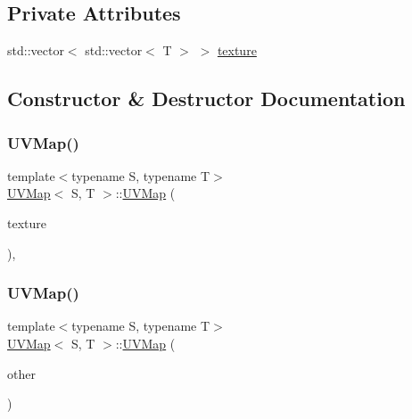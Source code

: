 \subsection*{Private Attributes}
\begin{DoxyCompactItemize}
\item 
std\+::vector$<$ std\+::vector$<$ T $>$ $>$ \mbox{\hyperlink{classUVMap_a6804b05501ac1221dd2e20eb43c83637}{texture}}
\end{DoxyCompactItemize}


\subsection{Constructor \& Destructor Documentation}
\mbox{\label{classUVMap_adc63ebfe75c0e4e3a1dfe47a4c0679f4}} 
\subsubsection{\texorpdfstring{UVMap()}{UVMap()}\hspace{0.1cm}{\footnotesize\ttfamily [1/2]}}
{\footnotesize\ttfamily template$<$typename S, typename T$>$ \\
\mbox{\hyperlink{classUVMap}{U\+V\+Map}}$<$ S, T $>$\+::\mbox{\hyperlink{classUVMap}{U\+V\+Map}} (\begin{DoxyParamCaption}\item[{const std\+::vector$<$ std\+::vector$<$ T $>$$>$ \&}]{texture }\end{DoxyParamCaption})\hspace{0.3cm}{\ttfamily [inline]}, {\ttfamily [explicit]}}

\mbox{\label{classUVMap_a0787e9239f59e850e4c3825d1985d8f3}} 
\subsubsection{\texorpdfstring{UVMap()}{UVMap()}\hspace{0.1cm}{\footnotesize\ttfamily [2/2]}}
{\footnotesize\ttfamily template$<$typename S, typename T$>$ \\
\mbox{\hyperlink{classUVMap}{U\+V\+Map}}$<$ S, T $>$\+::\mbox{\hyperlink{classUVMap}{U\+V\+Map}} (\begin{DoxyParamCaption}\item[{const \mbox{\hyperlink{classUVMap}{U\+V\+Map}}$<$ S, T $>$ \&}]{other }\end{DoxyParamCaption})\hspace{0.3cm}{\ttfamily [inline]}}



